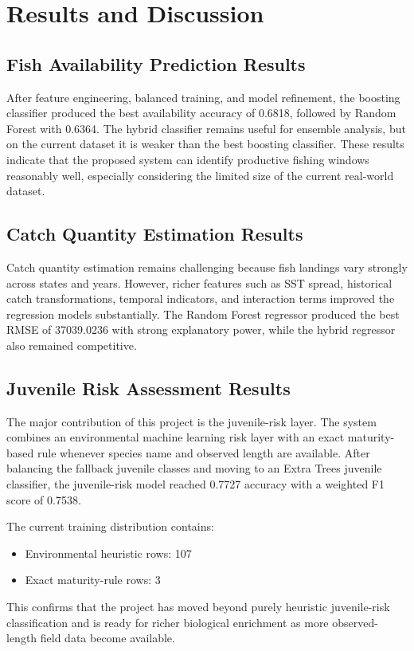 \documentclass[12pt,a4paper]{report}
\begin{document}
\section{Results and Discussion}

\subsection{Fish Availability Prediction Results}
After feature engineering, balanced training, and model refinement, the boosting classifier produced the best availability accuracy of 0.6818, followed by Random Forest with 0.6364. The hybrid classifier remains useful for ensemble analysis, but on the current dataset it is weaker than the best boosting classifier. These results indicate that the proposed system can identify productive fishing windows reasonably well, especially considering the limited size of the current real-world dataset.

\subsection{Catch Quantity Estimation Results}
Catch quantity estimation remains challenging because fish landings vary strongly across states and years. However, richer features such as SST spread, historical catch transformations, temporal indicators, and interaction terms improved the regression models substantially. The Random Forest regressor produced the best RMSE of 37039.0236 with strong explanatory power, while the hybrid regressor also remained competitive.

\subsection{Juvenile Risk Assessment Results}
The major contribution of this project is the juvenile-risk layer. The system combines an environmental machine learning risk layer with an exact maturity-based rule whenever species name and observed length are available. After balancing the fallback juvenile classes and moving to an Extra Trees juvenile classifier, the juvenile-risk model reached 0.7727 accuracy with a weighted F1 score of 0.7538.

The current training distribution contains:
\begin{itemize}[leftmargin=1.5cm]
    \item Environmental heuristic rows: 107
    \item Exact maturity-rule rows: 3
\end{itemize}
This confirms that the project has moved beyond purely heuristic juvenile-risk classification and is ready for richer biological enrichment as more observed-length field data become available.
\end{document}
